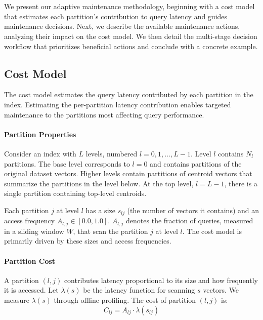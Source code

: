 \section{}
\label{sec:maintenance}

We present our adaptive maintenance methodology, beginning with a cost model that estimates each partition’s contribution to query latency and guides maintenance decisions. Next, we describe the available maintenance actions, analyzing their impact on the cost model. We then detail the multi-stage decision workflow that prioritizes beneficial actions and conclude with a concrete example.

\subsection{Cost Model}

The cost model estimates the query latency contributed by each partition in the index. Estimating the per-partition latency contribution enables targeted maintenance to the partitions most affecting query performance.

\paragraph{Partition Properties} 
Consider an index with $L$ levels, numbered $l = 0,1,\dots,L-1$. Level $l$ contains $N_l$ partitions. The base level corresponds to $l=0$ and contains partitions of the original dataset vectors. Higher levels contain partitions of centroid vectors that summarize the partitions in the level below. At the top level, $l=L-1$, there is a single partition containing top-level centroids.

Each partition $j$ at level $l$ has a size $s_{lj}$ (the number of vectors it contains) and an access frequency $A_{l,j} \in [0.0, 1.0]$. $A_{l,j}$ denotes the fraction of queries, measured in a sliding window $W$, that scan the partition $j$ at level $l$. The cost model is primarily driven by these sizes and access frequencies.

\paragraph{Partition Cost}
A partition $(l,j)$ contributes latency proportional to its size and how frequently it is accessed. Let $\lambda(s)$ be the latency function for scanning $s$ vectors. We measure $\lambda(s)$ through offline profiling. The cost of partition $(l,j)$ is:
\begin{equation}
C_{lj} = A_{lj} \cdot \lambda(s_{lj})
\label{eq:CostPartition}
\end{equation}

